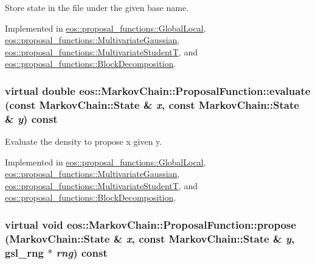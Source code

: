 Store state in the file under the given base name. 

Implemented in \hyperlink{classeos_1_1proposal__functions_1_1GlobalLocal_a07d947ae2de101cc4ef13577d5d81ad5}{eos::proposal\_\-functions::GlobalLocal}, \hyperlink{classeos_1_1proposal__functions_1_1MultivariateGaussian_a5ab69304a64a9a947c847b8bc842417f}{eos::proposal\_\-functions::MultivariateGaussian}, \hyperlink{classeos_1_1proposal__functions_1_1MultivariateStudentT_ab6afe975a0e1a553b785be0fd4daec05}{eos::proposal\_\-functions::MultivariateStudentT}, and \hyperlink{classeos_1_1proposal__functions_1_1BlockDecomposition_a6e35abd9d5995d4ce8cd931df9037034}{eos::proposal\_\-functions::BlockDecomposition}.\hypertarget{structeos_1_1MarkovChain_1_1ProposalFunction_ae3f2c43980ec9dfe9f35d8139f2f4ec7}{
\subsubsection[{evaluate}]{\setlength{\rightskip}{0pt plus 5cm}virtual double eos::MarkovChain::ProposalFunction::evaluate (const {\bf MarkovChain::State} \& {\em x}, \/  const {\bf MarkovChain::State} \& {\em y}) const}}
\label{structeos_1_1MarkovChain_1_1ProposalFunction_ae3f2c43980ec9dfe9f35d8139f2f4ec7}


Evaluate the density to propose x given y. 

Implemented in \hyperlink{classeos_1_1proposal__functions_1_1GlobalLocal_ad1f7d7686225e665edd47cbd230483f6}{eos::proposal\_\-functions::GlobalLocal}, \hyperlink{classeos_1_1proposal__functions_1_1MultivariateGaussian_a691b0b536abdd28e3cc629c27046603d}{eos::proposal\_\-functions::MultivariateGaussian}, \hyperlink{classeos_1_1proposal__functions_1_1MultivariateStudentT_a9ca45b3dad5b0e6612ba27f7fb4e1973}{eos::proposal\_\-functions::MultivariateStudentT}, and \hyperlink{classeos_1_1proposal__functions_1_1BlockDecomposition_a2ccb90e87ccd98a155af6ecd71e03cf5}{eos::proposal\_\-functions::BlockDecomposition}.\hypertarget{structeos_1_1MarkovChain_1_1ProposalFunction_a2b296008d32b1cd008e59cde1228705f}{
\subsubsection[{propose}]{\setlength{\rightskip}{0pt plus 5cm}virtual void eos::MarkovChain::ProposalFunction::propose ({\bf MarkovChain::State} \& {\em x}, \/  const {\bf MarkovChain::State} \& {\em y}, \/  gsl\_\-rng $\ast$ {\em rng}) const}}
\label{structeos_1_1MarkovChain_1_1ProposalFunction_a2b296008d32b1cd008e59cde1228705f}


